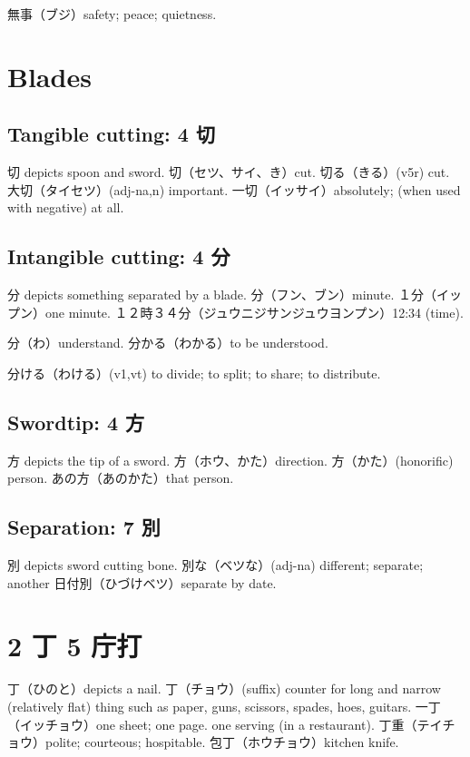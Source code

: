 無事（ブジ）safety; peace; quietness.

\section{Blades}

\subsection{Tangible cutting: 4 切}

切 depicts spoon and sword.
切（セツ、サイ、き）cut.
切る（きる）(v5r) cut.
大切（タイセツ）(adj-na,n) important.
一切（イッサイ）absolutely; (when used with negative) at all.

\subsection{Intangible cutting: 4 分}

分 depicts something separated by a blade.
分（フン、ブン）minute.
１分（イップン）one minute.
１２時３４分（ジュウニジサンジュウヨンプン）12:34 (time).

分（わ）understand.
分かる（わかる）to be understood.

分ける（わける）(v1,vt) to divide; to split; to share; to distribute.

\subsection{Swordtip: 4 方}

方 depicts the tip of a sword.
方（ホウ、かた）direction.
方（かた）(honorific) person.
あの方（あのかた）that person.

\subsection{Separation: 7 別}

別 depicts sword cutting bone.
別な（ベツな）(adj-na) different; separate; another
日付別（ひづけベツ）separate by date.

\section{2 丁 5 庁打}

丁（ひのと）depicts a nail.
丁（チョウ）(suffix)
counter for long and narrow (relatively flat) thing
such as paper, guns, scissors, spades, hoes, guitars.
一丁（イッチョウ）one sheet; one page.
one serving (in a restaurant).
丁重（テイチョウ）polite; courteous; hospitable.
包丁（ホウチョウ）kitchen knife.

